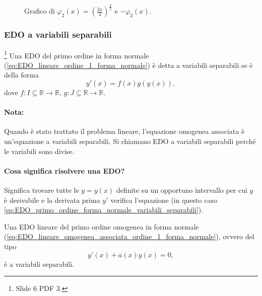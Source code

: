 \begin{figure}
    \caption{Grafico di $\varphi_2(x)=\left(\frac{2x}{3}\right)^{\frac{3}{2}}$ e $-\varphi_2(x)$.}
    \label{fig:phi}
\end{figure}

\subsubsection{EDO a variabili separabili}
\begin{definition}
    \footnote{Slide 6 PDF 3.} Una EDO del primo ordine in forma normale (\ref{eq:EDO_lineare_ordine_1_forma_normale}) è detta a variabili separabili se è della forma
    \begin{equation}\label{eq:EDO_primo_ordine_forma_normale_variabili_separabili}
        y'(x) = f(x) g(y(x)),
    \end{equation}
    dove $f:I\subseteq \mathbb R\rightarrow\mathbb R,\, g: J\subseteq\mathbb R\rightarrow\mathbb R$.
\end{definition}

\paragraph{Nota:} Quando è stato trattato il problema lineare, l'equazione omogenea associata è un'equazione a variabili separabili. Si chiamano EDO a variabili separabili perché le variabili sono divise.

\paragraph{Cosa significa risolvere una EDO?} Significa trovare tutte le $y=y(x)$ definite su un opportuno intervallo per cui $y$ è derivabile e la derivata prima $y'$ verifica l'equazione (in questo caso \ref{eq:EDO_primo_ordine_forma_normale_variabili_separabili}). 

\begin{remark}
    Una EDO lineare del primo ordine omogenea in forma normale (\ref{eq:EDO_lineare_omogenea_associata_ordine_1_forma_normale}), ovvero del tipo
    \begin{equation*}
        y'(x) + a(x) y(x) = 0,
    \end{equation*}
    è a variabili separabili.
\end{remark}

